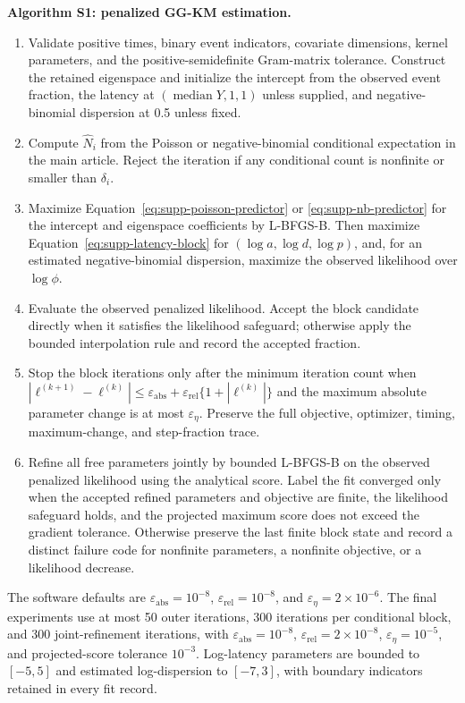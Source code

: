\documentclass[11pt]{article}
\begin{document}
\textbf{Algorithm S1: penalized GG-KM estimation.}
\begin{enumerate}
\item Validate positive times, binary event indicators, covariate dimensions, kernel parameters, and the positive-semidefinite Gram-matrix tolerance. Construct the retained eigenspace and initialize the intercept from the observed event fraction, the latency at $(\operatorname{median}Y,1,1)$ unless supplied, and negative-binomial dispersion at 0.5 unless fixed.
\item Compute $\widehat N_i$ from the Poisson or negative-binomial conditional expectation in the main article. Reject the iteration if any conditional count is nonfinite or smaller than $\delta_i$.
\item Maximize Equation~\eqref{eq:supp-poisson-predictor} or \eqref{eq:supp-nb-predictor} for the intercept and eigenspace coefficients by L-BFGS-B. Then maximize Equation~\eqref{eq:supp-latency-block} for $(\log a,\log d,\log p)$, and, for an estimated negative-binomial dispersion, maximize the observed likelihood over $\log\phi$.
\item Evaluate the observed penalized likelihood. Accept the block candidate directly when it satisfies the likelihood safeguard; otherwise apply the bounded interpolation rule and record the accepted fraction.
\item Stop the block iterations only after the minimum iteration count when $|\ell^{(k+1)}-\ell^{(k)}|\leq\varepsilon_{\mathrm{abs}}+\varepsilon_{\mathrm{rel}}\{1+|\ell^{(k)}|\}$ and the maximum absolute parameter change is at most $\varepsilon_\eta$. Preserve the full objective, optimizer, timing, maximum-change, and step-fraction trace.
\item Refine all free parameters jointly by bounded L-BFGS-B on the observed penalized likelihood using the analytical score. Label the fit converged only when the accepted refined parameters and objective are finite, the likelihood safeguard holds, and the projected maximum score does not exceed the gradient tolerance. Otherwise preserve the last finite block state and record a distinct failure code for nonfinite parameters, a nonfinite objective, or a likelihood decrease.
\end{enumerate}
The software defaults are $\varepsilon_{\mathrm{abs}}=10^{-8}$, $\varepsilon_{\mathrm{rel}}=10^{-8}$, and $\varepsilon_\eta=2\times10^{-6}$. The final experiments use at most 50 outer iterations, 300 iterations per conditional block, and 300 joint-refinement iterations, with $\varepsilon_{\mathrm{abs}}=10^{-8}$, $\varepsilon_{\mathrm{rel}}=2\times10^{-8}$, $\varepsilon_\eta=10^{-5}$, and projected-score tolerance $10^{-3}$. Log-latency parameters are bounded to $[-5,5]$ and estimated log-dispersion to $[-7,3]$, with boundary indicators retained in every fit record.
\end{document}

